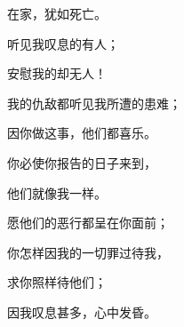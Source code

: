 {\par }{\Q 在家，犹如死亡。
\par }{\BB \par }{\Q {}听见我叹息的有人；
\par }{\Q 安慰我的却无人！
\par }{\Q 我的仇敌都听见我所遭的患难；
\par }{\Q 因你做这事，他们都喜乐。
\par }{\Q 你必使你报告的日子来到，
\par }{\Q 他们就像我一样。
\par }{\Q {}愿他们的恶行都呈在你面前；
\par }{\Q 你怎样因我的一切罪过待我，
\par }{\Q 求你照样待他们；
\par }{\Q 因我叹息甚多，心中发昏。

}

